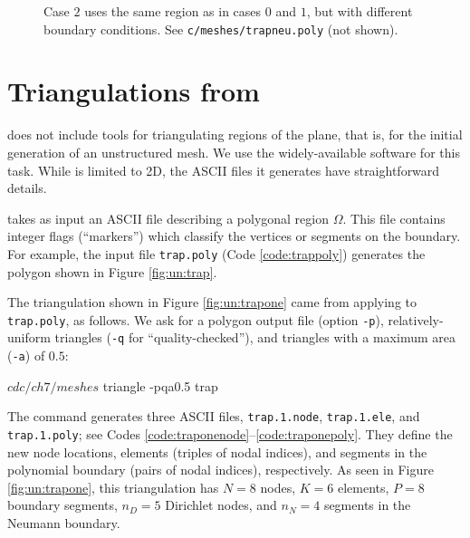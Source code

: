 \begin{figure}

\caption{Case $2$ uses the same region as in cases $0$ and $1$, but with different boundary conditions.  See \texttt{c/\CODELOC meshes/trapneu.poly} (not shown).}
\label{fig:un:trapneu}
\end{figure}


\section{Triangulations from \Triangle}

\PETSc does not include tools for triangulating regions of the plane, that is, for the initial generation of an unstructured mesh.  We use the widely-available \Triangle{} software \citep{Shewchuk1996} for this task.  While \Triangle is limited to 2D, the ASCII files it generates have straightforward details.


\Triangle takes as input an ASCII file describing a polygonal region $\Omega$.  This file contains integer flags (``markers'') which classify the vertices or segments on the boundary.  For example, the input file \texttt{trap.poly} (Code \ref{code:trappoly}) generates the polygon shown in Figure \ref{fig:un:trap}.

The triangulation shown in Figure \ref{fig:un:trapone} came from applying \Triangle to \texttt{trap.poly}, as follows.  We ask for a polygon output file (option \texttt{-p}), relatively-uniform triangles (\texttt{-q} for ``quality-checked''), and triangles with a maximum area (\texttt{-a}) of $0.5$:
\begin{cline}
$ cd c/ch7/meshes
$ triangle -pqa0.5 trap
\end{cline}
The command generates three ASCII files, \texttt{trap.1.node}, \texttt{trap.1.ele}, and \texttt{trap.1.poly}; see Codes \ref{code:traponenode}--\ref{code:traponepoly}.  They define the new node locations, elements (triples of nodal indices), and segments in the polynomial boundary (pairs of nodal indices), respectively.  As seen in Figure \ref{fig:un:trapone}, this triangulation has $N=8$ nodes, $K=6$ elements, $P=8$ boundary segments, $n_D=5$ Dirichlet nodes, and $n_N=4$ segments in the Neumann boundary.

